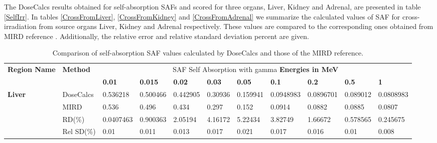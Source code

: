 \documentclass[letterpaper,12pt]{article}
\begin{document}
The DoseCalcs results obtained for self-absorption SAFs and scored for three organs, Liver, Kidney and Adrenal, are presented in table \ref{SelfIrr}. In tables \ref{CrossFromLiver}, \ref{CrossFromKidney} and \ref{CrossFromAdrenal} we summarize the calculated values of SAF for cross-irradiation from source organs Liver, Kidney and Adrenal respectively. These values are compared to the corresponding ones obtained from MIRD reference \cite{MIRDRefPhantomData}. Additionally, the relative error and relative standard deviation percent are given.

\begin{table}[H]
\centering
\caption{Comparison of self-absorption SAF values calculated by DoseCalcs and those of the MIRD reference.}
\begin{adjustbox}{width=\columnwidth,center}
\begin{threeparttable}
\begin{tabular}{lllllllllll} \hline 
\multicolumn{1}{c}{\multirow{2}{*}{\textbf{Region Name}}} & \multirow{2}{*}{\textbf{Method}} & \multicolumn{9}{c}{ SAF Self Absorption with gamma \textbf{Energies in MeV}}       \\ \cline{3-11}
                 \multicolumn{1}{c}{}                             & \multicolumn{1}{c}{}                           & \textbf{0.01}   & \textbf{0.015}   & \textbf{0.02}   & \textbf{0.03}   & \textbf{0.05}   & \textbf{0.1}   & \textbf{0.2}   & \textbf{0.5}   & \textbf{1}       \\\hline 
\multirow{4}{*}{\textbf{Liver}}       & DoseCalcs                                         & 0.536218        & 0.500466        & 0.442905        & 0.30936        & 0.159941        & 0.0948983        & 0.0896701        & 0.089012        & 0.0808983        \\ 
                             & MIRD                                        & 0.536        & 0.496        & 0.434        & 0.297        & 0.152        & 0.0914        & 0.0882        & 0.0885        & 0.0807        \\ 
                             & RD(\%)\tnote{a}                                        & 0.0407463        & 0.900363        & 2.05194        & 4.16172        & 5.22434        & 3.82749        & 1.66672        & 0.578565        & 0.245675        \\ 
                             & Rel SD(\%)\tnote{b}                                          & 0.01        & 0.011        & 0.013        & 0.017        & 0.021        & 0.017        & 0.016        & 0.01        & 0.008               \\\hline 

\end{tabular}
\end{threeparttable}
\end{adjustbox}
\end{table}
\end{document}
